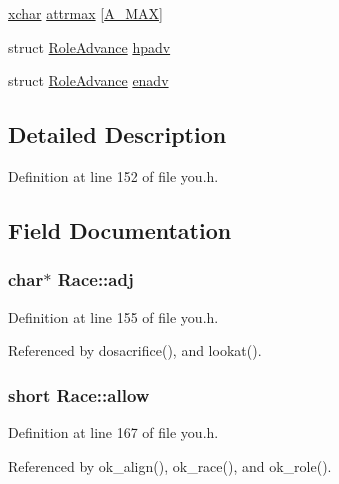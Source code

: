 \begin{DoxyCompactItemize}
\item 
\hyperlink{global_8h_a2043b7d01ce89f4ee2fa6c345a752d32}{xchar} \hyperlink{structRace_a5ec95f2579dea6b6c78c95ed2de00050}{attrmax} \mbox{[}\hyperlink{attrib_8h_a8f8289cfc29e0bb2a2626262bfeedf21}{A\+\_\+\+M\+A\+X}\mbox{]}
\item 
struct \hyperlink{structRoleAdvance}{Role\+Advance} \hyperlink{structRace_ab04a220ff266bdf1029c414974e85db8}{hpadv}
\item 
struct \hyperlink{structRoleAdvance}{Role\+Advance} \hyperlink{structRace_ad94f1e078415a0f0a5633b2522042ad2}{enadv}
\end{DoxyCompactItemize}


\subsection{Detailed Description}


Definition at line 152 of file you.\+h.



\subsection{Field Documentation}
\hypertarget{structRace_a61ff8fd4db65f11000381aa0dff23e55}{
\subsubsection[{adj}]{ char$\ast$ Race\+::adj}}\label{structRace_a61ff8fd4db65f11000381aa0dff23e55}


Definition at line 155 of file you.\+h.



Referenced by dosacrifice(), and lookat().

\hypertarget{structRace_ab83e1168110644aaec0af3651a2bad12}{
\subsubsection[{allow}]{\setlength{\rightskip}{0pt plus 5cm}short Race\+::allow}}\label{structRace_ab83e1168110644aaec0af3651a2bad12}


Definition at line 167 of file you.\+h.



Referenced by ok\+\_\+align(), ok\+\_\+race(), and ok\+\_\+role().

